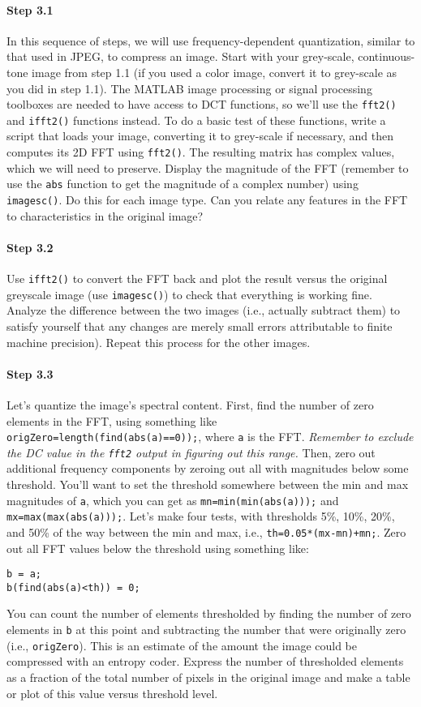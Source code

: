 \paragraph{Step 3.1} In this sequence of steps, we will use
frequency-dependent quantization, similar to that used in JPEG, to
compress an image. Start with your grey-scale, continuous-tone image
from step 1.1 (if you used a color image, convert it to grey-scale as
you did in step 1.1). The MATLAB image processing or signal processing
toolboxes are needed to have access to DCT functions, so we'll use the
\verb|fft2()| and \verb|ifft2()| functions instead. To do a basic test
of these functions, write a script that loads your image, converting
it to grey-scale if necessary, and then computes its 2D FFT using
\verb|fft2()|. The resulting matrix has complex values, which we will
need to preserve. Display the magnitude of the FFT (remember to use
the \verb|abs| function to get the magnitude of a complex number)
using \verb|imagesc()|. Do this for each image type.  Can you relate
any features in the FFT to characteristics in the original image?

\paragraph{Step 3.2} Use \verb|ifft2()| to convert the FFT back and
plot the result versus the original greyscale image (use
\verb|imagesc()|) to check that everything is working fine. Analyze
the difference between the two images (i.e., actually subtract them)
to satisfy yourself that any changes are merely small errors
attributable to finite machine precision). Repeat this process for the
other images.

\paragraph{Step 3.3} Let's quantize the image's spectral
content. First, find the number of zero elements in the FFT, using
something like \verb|origZero=length(find(abs(a)==0));|, where
\verb|a| is the FFT. \emph{Remember to exclude the DC value in the
  \texttt{fft2} output in figuring out this range.} Then, zero out
additional frequency components by zeroing out all with magnitudes
below some threshold. You'll want to set the threshold somewhere
between the min and max magnitudes of \verb|a|, which you can get as
\verb|mn=min(min(abs(a)));| and \verb|mx=max(max(abs(a)));|. Let's
make four tests, with thresholds 5\%, 10\%, 20\%, and 50\% of the way
between the min and max, i.e., \verb|th=0.05*(mx-mn)+mn;|. Zero out
all FFT values below the threshold using something like:
\begin{verbatim}
b = a;
b(find(abs(a)<th)) = 0;
\end{verbatim}
You can count the number of elements thresholded by finding the number
of zero elements in \verb|b| at this point and subtracting the number
that were originally zero (i.e., \verb|origZero|). This is an estimate
of the amount the image could be compressed with an entropy
coder. Express the number of thresholded elements as a fraction of the
total number of pixels in the original image and make a table or plot
of this value versus threshold level.

